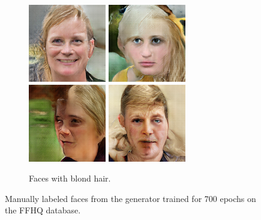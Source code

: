 \begin{figure}[!h]
\begin{subfigure}[b]{\textwidth}
{            \includegraphics[scale=0.485]{figures/ffhq/labeled-hair-blonde/ffhq128x128_image022.png}
            \includegraphics[scale=0.485]{figures/ffhq/labeled-hair-blonde/ffhq128x128_image035.png}
            \includegraphics[scale=0.485]{figures/ffhq/labeled-hair-blonde/ffhq128x128_image043.png}
            \includegraphics[scale=0.485]{figures/ffhq/labeled-hair-blonde/ffhq128x128_image044.png}
        }
        \caption{Faces with blond hair.}
    \end{subfigure}
    \caption{\label{fig:appendix-ffhq-labeled}Manually labeled faces from the generator trained for 700 epochs on the FFHQ database.}
\end{figure}

\clearpage

